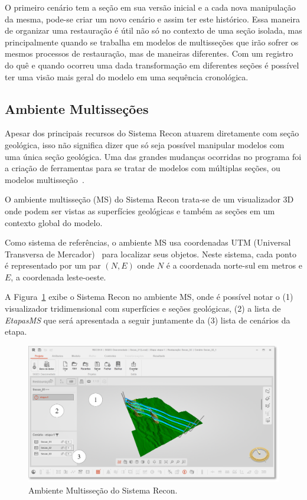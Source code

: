O primeiro cenário tem a seção em sua versão inicial e a cada nova manipulação da mesma, pode-se criar um novo cenário e assim ter este histórico. Essa maneira de organizar uma restauração é útil não só no contexto de uma seção isolada, mas principalmente quando se trabalha em modelos de multisseções que irão sofrer os mesmos processos de restauração, mas de maneiras diferentes. Com um registro do quê e quando ocorreu uma dada transformação em diferentes seções é possível ter uma visão mais geral do modelo em uma sequência cronológica.

\subsection{Ambiente Multisseções}

Apesar dos principais recursos do Sistema Recon atuarem diretamente com seção geológica, isso não significa dizer que só seja possível manipular modelos com uma única seção geológica. Uma das grandes mudanças ocorridas no programa foi a criação de ferramentas para se tratar de modelos com múltiplas seções, ou modelos multisseção~\cite{Felipe, Garcia}.

O ambiente multisseção (MS) do Sistema Recon trata-se de um visualizador 3D onde podem ser vistas as superfícies geológicas e também as seções em um contexto global do modelo.

Como sistema de referências, o ambiente MS usa coordenadas UTM (Universal Transversa de Mercador)~\cite{IBGE} para localizar seus objetos. Neste sistema, cada ponto é representado por um par $(N, E)$ onde $N$ é a coordenada norte-sul em metros e $E$, a coordenada leste-oeste.

A Figura~\ref{fig-recon-7} exibe o Sistema Recon no ambiente MS, onde é possível notar o (1) visualizador tridimensional com superfícies e seções geológicas, (2) a lista de \textit{EtapasMS} que será apresentada a seguir juntamente da (3) lista de cenários da etapa.

\begin{figure} [H]
  \begin{center}
    \includegraphics[width=\textwidth]{images/fig-recon-7}
    \caption{Ambiente Multisseção do Sistema Recon.}\label{fig-recon-7}
  \end{center}
\end{figure}


